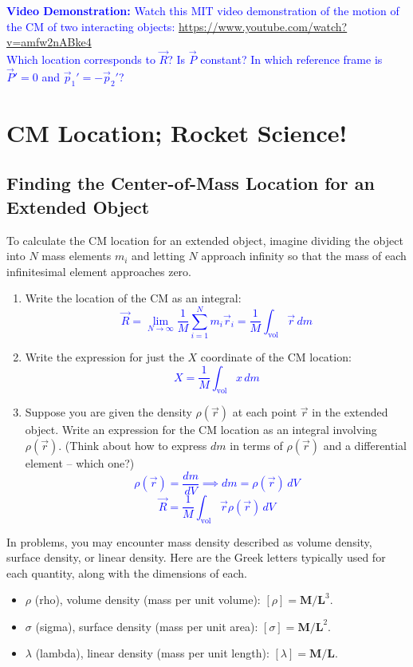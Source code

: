 \documentclass[11pt, letterpaper, openany]{book}
\newenvironment{exercise}[1][Exercise]{%
  \tcolorbox[blanker, breakable, left=1em,
    before skip=1em, after skip=1em,
    borderline west={3pt}{0pt}{PhysNavy},
    colback=PhysCream,
    before upper={\textcolor{PhysNavy}{\sffamily\bfseries #1:}\space}
  ]%
}{%
  \endtcolorbox%
}
\begin{document}
\textcolor{blue}{\textbf{Video Demonstration:} Watch this MIT video demonstration of the motion of the CM of two interacting objects: \url{https://www.youtube.com/watch?v=amfw2nABke4} \\
Which location corresponds to $\vec{R}$? Is $\vec{P}$ constant? In which reference frame is $\vec{P}' = 0$ and $\vec{p}_1' = -\vec{p}_2'$?}

\chapter{CM Location; Rocket Science!}

\section*{Finding the Center-of-Mass Location for an Extended Object}

\begin{exercise}[Exercise 1]
To calculate the CM location for an extended object, imagine dividing the object into $N$ mass elements $m_i$ and letting $N$ approach infinity so that the mass of each infinitesimal element approaches zero.
\begin{enumerate}[label=(\alph*)]
    \item Write the location of the CM as an integral: \\
    \textcolor{blue}{\[ \vec{R} = \lim_{N\to\infty} \frac{1}{M}\sum_{i=1}^N m_i\vec{r}_i = \frac{1}{M}\int_{\text{vol}} \vec{r} \, dm \]}
    \item Write the expression for just the $X$ coordinate of the CM location: \\
    \textcolor{blue}{\[ X = \frac{1}{M}\int_{\text{vol}} x \, dm \]}
    \item Suppose you are given the density $\rho(\vec{r})$ at each point $\vec{r}$ in the extended object. Write an expression for the CM location as an integral involving $\rho(\vec{r})$. (Think about how to express $dm$ in terms of $\rho(\vec{r})$ and a differential element -- which one?) \\
    \textcolor{blue}{
    \[ \rho(\vec{r}) = \frac{dm}{dV} \implies dm = \rho(\vec{r})\,dV \]
    \[ \vec{R} = \frac{1}{M}\int_{\text{vol}} \vec{r}\rho(\vec{r})\,dV \]
    }
\end{enumerate}
\end{exercise}

In problems, you may encounter mass density described as volume density, surface density, or linear density. Here are the Greek letters typically used for each quantity, along with the dimensions of each.
\begin{itemize}
    \item $\rho$ (rho), volume density (mass per unit volume): $[\rho] = \mathbf{M}/\mathbf{L}^3$.
    \item $\sigma$ (sigma), surface density (mass per unit area): $[\sigma] = \mathbf{M}/\mathbf{L}^2$.
    \item $\lambda$ (lambda), linear density (mass per unit length): $[\lambda] = \mathbf{M}/\mathbf{L}$.
\end{itemize}
\end{document}
